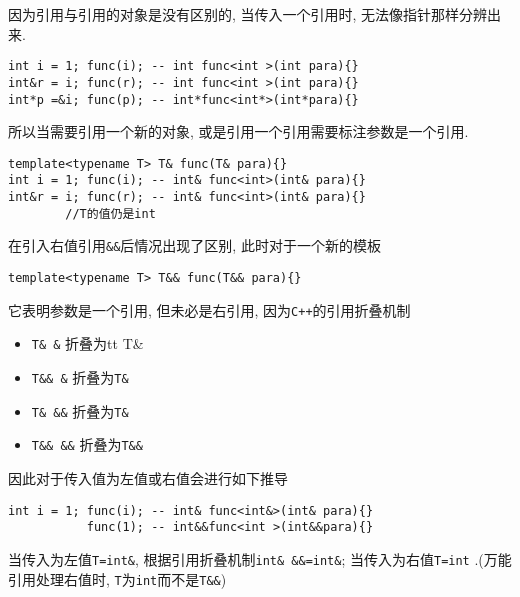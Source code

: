\begin{paracol}{2}
	\begin{leftcolumn}
		因为引用与引用的对象是没有区别的, 当传入一个引用时, 无法像指针那样分辨出来.
	\end{leftcolumn}
	\begin{rightcolumn}
		\begin{lstlisting}[xleftmargin=2em]
int i = 1; func(i); -- int func<int >(int para){} 
int&r = i; func(r); -- int func<int >(int para){}
int*p =&i; func(p); -- int*func<int*>(int*para){} 
		\end{lstlisting}
	\end{rightcolumn}
	\begin{leftcolumn*}
		所以当需要引用一个新的对象, 或是引用一个引用需要标注参数是一个引用.
	\end{leftcolumn*}
	\begin{rightcolumn}
		\begin{lstlisting}[xleftmargin=2em]
template<typename T> T& func(T& para){}
int i = 1; func(i); -- int& func<int>(int& para){}
int&r = i; func(r); -- int& func<int>(int& para){}
		//T的值仍是int
		\end{lstlisting}
	\end{rightcolumn}
\end{paracol}

在引入右值引用{\tt \&\&}后情况出现了区别, 此时对于一个新的模板
\begin{lstlisting}[xleftmargin=10em,xrightmargin=10em]
template<typename T> T&& func(T&& para){}
\end{lstlisting}

它表明参数是一个引用, 但未必是右引用, 因为{\tt C++}的引用折叠机制
\begin{itemize}
	\item {\tt T\&  \&} 折叠为{tt T\&}
	\item {\tt T\&\& \&} 折叠为{\tt T\&}
	\item {\tt T\&  \&\&} 折叠为{\tt T\&}
	\item {\tt T\&\& \&\&} 折叠为{\tt T\&\&}
\end{itemize}

因此对于传入值为左值或右值会进行如下推导
\begin{lstlisting}[xleftmargin=4em,xrightmargin=2em]
int i = 1; func(i); -- int& func<int&>(int& para){}
		   func(1); -- int&&func<int >(int&&para){}
\end{lstlisting}

当传入为左值{\tt T=int\&}, 根据引用折叠机制{\tt int\& \&\&=int\&}; 当传入为右值{\tt T=int}
.(万能引用处理右值时, {\tt T}为{\tt int}而不是{\tt T\&\&})

